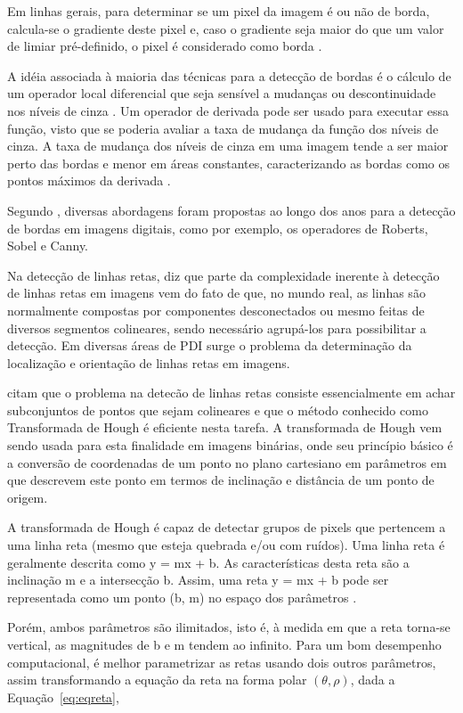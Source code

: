 Em linhas gerais, para determinar se um pixel da imagem é ou não de borda, calcula-se o gradiente deste pixel e, caso o gradiente seja maior do que um valor de limiar pré-definido, o pixel é considerado como borda \cite{Silva2001}.

A idéia associada à maioria das técnicas para a detecção de bordas é o cálculo de um operador local diferencial que seja sensível a mudanças ou descontinuidade nos níveis de cinza \cite{GONZALEZ2002}. Um operador de derivada pode ser usado para executar essa função, visto que se poderia avaliar a taxa de mudança da função dos níveis de cinza. A taxa de mudança dos níveis de cinza em uma imagem tende a ser maior perto das bordas e menor em áreas constantes, caracterizando as bordas como os pontos máximos da derivada \cite{PEDRINI2008}.

Segundo , diversas abordagens foram propostas ao longo dos anos para a detecção de bordas em imagens digitais, como por exemplo, os operadores de Roberts, Sobel e Canny. %

Na detecção de linhas retas,  diz que parte da complexidade inerente à detecção de linhas retas em imagens vem do fato de que, no mundo real, as linhas são normalmente compostas por componentes desconectados ou mesmo feitas de diversos segmentos colineares, sendo necessário agrupá-los para possibilitar a detecção. Em diversas áreas de PDI surge o problema da determinação da localização e orientação de linhas retas em imagens.

 citam que o problema na detecão de linhas retas consiste essencialmente em achar subconjuntos de pontos que sejam colineares e que o método conhecido como Transformada de Hough é eficiente nesta tarefa. A transformada de Hough vem sendo usada para esta finalidade em imagens binárias, onde seu princípio básico é a conversão de coordenadas de um ponto no plano cartesiano em parâmetros em que descrevem este ponto em termos de inclinação e distância de um ponto de origem.


A transformada de Hough é capaz de detectar grupos de pixels que pertencem a uma linha reta (mesmo que esteja quebrada e/ou com ruídos). Uma linha reta é geralmente descrita como y = mx + b. As características desta reta são a inclinação m e a intersecção b. Assim, uma reta y = mx + b pode ser representada como um ponto (b, m) no espaço dos parâmetros \cite{HOUGHKIM}. 

Porém, ambos parâmetros são ilimitados, isto é, à medida em que a reta torna-se vertical, as magnitudes de b e m tendem ao infinito. Para um bom desempenho computacional, é melhor parametrizar as retas usando dois outros parâmetros, assim transformando a equação da reta na forma polar $(\theta, \rho)$, dada a Equação~\ref{eq:eqreta},

